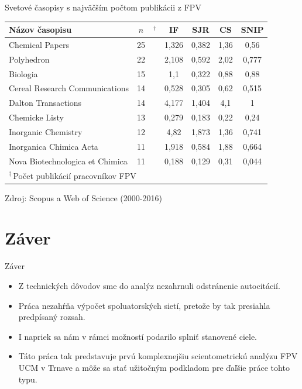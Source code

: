 \documentclass{beamer}
\begin{document}
%
%
\begin{frame}{Svetové časopisy s najväčším počtom publikácii z FPV}
  \begin{table}
    \footnotesize
    \begin{tabular}{lc@{}lcccc}
    \toprule
     Názov časopisu & $n$&$^\dagger$ & IF & SJR  & CS & SNIP \\
    \midrule
    Chemical Papers                 & 25& & 1,326           & 0,382 & 1,36           & 0,56\phantom{0} \\
    Polyhedron                      & 22& & 2,108           & 0,592 & 2,02           & 0,777           \\
    Biologia                        & 15& & 1,1\phantom{00} & 0,322 & 0,88           & 0,88\phantom{0} \\
    Cereal Research Communications  & 14& & 0,528           & 0,305 & 0,62           & 0,515           \\
    Dalton Transactions             & 14& & 4,177           & 1,404 & 4,1\phantom{0} & 1\phantom{,000} \\[1ex]
    Chemicke Listy                  & 13& & 0,279           & 0,183 & 0,22           & 0,24\phantom{0} \\
    Inorganic Chemistry             & 12& & 4,82\phantom{0} & 1,873 & 1,36           & 0,741           \\
    Inorganica Chimica Acta         & 11& & 1,918           & 0,584 & 1,88           & 0,664           \\
    Nova Biotechnologica et Chimica & 11& & 0,188           & 0,129 & 0,31           & 0,044           \\
    \bottomrule
    \multicolumn{7}{l}{\tiny $^\dagger$\,Počet publikácií pracovníkov FPV} \\
  \end{tabular}
\end{table}
\parbox{\textwidth}{\centering\tiny Zdroj: Scopus a Web of Science (2000-2016)}
\end{frame}


\section{Záver}

\begin{frame}{Záver}
  \begin{itemize}
  \item<1-> Z technických dôvodov sme do analýz nezahrnuli odstránenie
    autocitácií.
  \item<2-> Práca nezahŕňa výpočet spoluatorských sietí, pretože by tak
    presiahla predpísaný rozsah.
  \item<3-> I napriek sa nám v rámci možností podarilo splniť stanovené ciele.
  \item<4-> Táto práca tak predstavuje prvú komplexnejšiu scientometrickú
    analýzu FPV UCM v Trnave a môže sa stať užitočným podkladom pre ďaľšie práce
    tohto typu.
  \end{itemize}
\end{frame}
\end{document}

